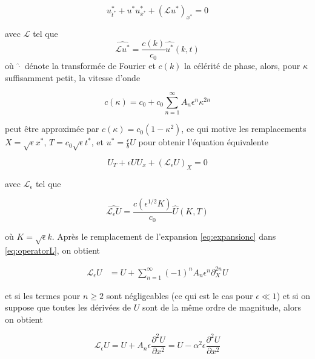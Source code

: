 $$ u^*_{t^*} + u^*u^*_{x^*}+(\mathcal{L} u^*)_{x^*} = 0$$

\noindent avec $\mathcal{L}$ tel que $$ \widehat{\mathcal{L}u^*} = \frac{c(k)}{c_0} \widehat{u^*}(k,t)$$ où $\hat \cdot$ dénote la transformée de Fourier et  $c(k)$ la célérité  de phase, alors, pour $\kappa$ suffisamment petit, la vitesse d'onde

\begin{equation}
\label{eq:expansionc}
c(\kappa) = c_0 + c_0 \sum_{n=1}^{\infty}A_n\epsilon^n\kappa^{2n}
\end{equation}

\noindent peut être approximée par  $c(\kappa) = c_0(1-\kappa^2)$, ce qui motive les remplacements $ X=\sqrt{\epsilon}x^*$, $T =c_0 \sqrt{\epsilon} t^*$, et $u^* = \frac{\epsilon}{ b} U$ pour obtenir l'équation équivalente   





\begin{equation}
\label{eq:scaledEquation}
 U_T + \epsilon U U_x+(\mathcal{L}_{\epsilon} U)_{X} = 0
 \end{equation}

\noindent avec $\mathcal{L}_\epsilon$ tel que 

\begin{equation}
\label{eq:operatorL}
\widehat{\mathcal{L}_\epsilon U} = \frac{c(\epsilon^{1/2} K)}{c_0} \hat{U}(K,T)
\end{equation}

\noindent où $K=\sqrt{\epsilon} k$. Après le remplacement de l'expansion \eqref{eq:expansionc} dans \eqref{eq:operatorL}, on obtient

\begin{align}
  \label{eq:expansionLe}
    \mathcal{L}_\epsilon U &=U +\sum_{n=1}^\infty (-1)^n A_n \epsilon^n \partial_X^{2n} U    
\end{align}

\noindent et si les termes pour $n\geq2$ sont négligeables (ce qui est le cas pour $\epsilon \ll 1 $) et si on suppose que toutes les dérivées de $U$ sont de la même ordre de magnitude, alors on obtient

\begin{equation*}
    \mathcal{L}_\epsilon U = U + A_n \epsilon \frac{\partial^2 U}{\partial x^2} = U - \alpha^2 \epsilon \frac{\partial^2 U}{\partial x^2}
\end{equation*}

